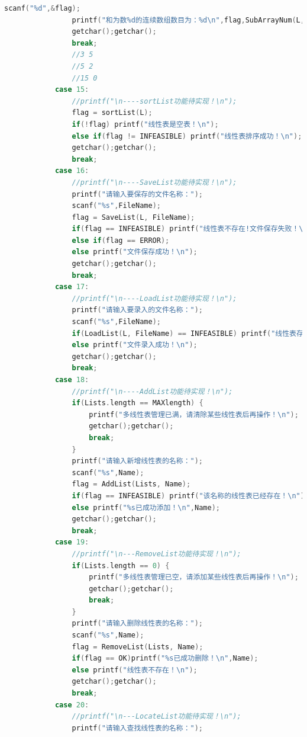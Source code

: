 \documentclass[supercite]{Experimental_Report}
\theoremstyle{definition}
\begin{document}
\begin{lstlisting}[language=c]
                scanf("%d",&flag);
                printf("和为数%d的连续数组数目为：%d\n",flag,SubArrayNum(L,flag));
                getchar();getchar();
                break;
                //3 5
                //5 2
                //15 0
            case 15:
                //printf("\n----sortList功能待实现！\n");
                flag = sortList(L);
                if(!flag) printf("线性表是空表！\n");
                else if(flag != INFEASIBLE) printf("线性表排序成功！\n");
                getchar();getchar();
                break;
            case 16:
                //printf("\n----SaveList功能待实现！\n");
                printf("请输入要保存的文件名称：");
                scanf("%s",FileName);
                flag = SaveList(L, FileName);
                if(flag == INFEASIBLE) printf("线性表不存在!文件保存失败！\n");
                else if(flag == ERROR);
                else printf("文件保存成功！\n");
                getchar();getchar();
                break;
            case 17:
                //printf("\n----LoadList功能待实现！\n");
                printf("请输入要录入的文件名称：");
                scanf("%s",FileName);
                if(LoadList(L, FileName) == INFEASIBLE) printf("线性表存在!文件录入失败！\n");
                else printf("文件录入成功！\n");
                getchar();getchar();
                break;
            case 18:
                //printf("\n----AddList功能待实现！\n");
                if(Lists.length == MAXlength) {
                	printf("多线性表管理已满，请清除某些线性表后再操作！\n");
                	getchar();getchar();
                	break;
				}
                printf("请输入新增线性表的名称：");
                scanf("%s",Name);
                flag = AddList(Lists, Name);
                if(flag == INFEASIBLE) printf("该名称的线性表已经存在！\n");
                else printf("%s已成功添加！\n",Name);
                getchar();getchar();
                break;
            case 19:
                //printf("\n---RemoveList功能待实现！\n");
                if(Lists.length == 0) {
					printf("多线性表管理已空，请添加某些线性表后再操作！\n");
					getchar();getchar();
                	break;
				}
				printf("请输入删除线性表的名称：");
                scanf("%s",Name);
                flag = RemoveList(Lists, Name);
                if(flag == OK)printf("%s已成功删除！\n",Name);
                else printf("线性表不存在！\n"); 
                getchar();getchar();
                break;
            case 20:
                //printf("\n---LocateList功能待实现！\n");
                printf("请输入查找线性表的名称：");

\end{lstlisting}
\end{document}
